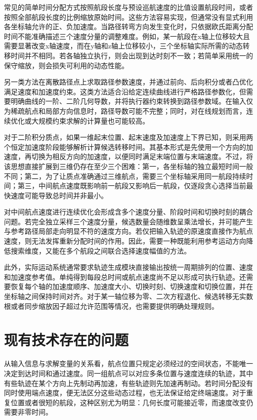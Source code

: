 \documentclass[UTF8,a4paper,12pt,fontset=fandol]{ctexart}
\begin{document}
常见的简单时间分配方式按照航段长度与预设巡航速度的比值设置航段时间，或者按照全部航段长度的比例缩放原始时间。这些方法容易实现，但通常没有显式利用各坐标轴允许的正、负加速度。当路径转弯方向发生变化时，只依据欧氏距离分配时间不能准确描述三个速度分量的调整难度。例如，某一航段在x轴上位移较大且需要显著改变x轴速度，而在y轴和z轴上位移较小，三个坐标轴实际所需的动态转移时间并不相同。若各轴独立执行，则会出现到达时刻不一致；若简单采用统一的保守缩放，则会损失可利用的动态性能。

另一类方法在离散路径点上求取路径参数速度，并通过前向、后向积分或者凸优化满足速度和加速度约束。这类方法适合沿给定连续曲线进行严格路径参数化，但需要明确曲线的一阶、二阶几何导数，并将执行器约束转换到路径参数域。在输入仅为稀疏航点和局部方向信息时，路径导数可能不完整；同时，对在线规划而言，连续优化或大规模约束求解的计算量也可能较高。

对于二阶积分质点，如果一维起末位置、起末速度及加速度上下界已知，则采用两个恒定加速度阶段能够解析计算候选转移时间。其基本形式是先使用一个方向的加速度，再切换为相反方向的加速度，以便同时满足末端位置与末端速度。不过，将该思想直接扩展到三维仍存在至少三个困难：第一，各坐标轴的独立最短时间一般不同；第二，为了让质点准确通过三维航点，需要三个坐标轴采用同一航段持续时间；第三，中间航点速度既影响前一航段又影响后一航段，仅逐段贪心选择当前最快速度可能导致总时间并非最小。

对中间航点速度进行连续优化会形成含多个速度分量、阶段时间和切换时刻的耦合问题。若完全独立采样三个速度分量，候选数量会随维数呈乘法增长，并可能产生与参考路径局部走向明显不符的速度方向。若仅把输入轨迹的原速度直接作为航点速度，则无法发挥重新分配时间的作用。因此，需要一种既能利用参考运动方向降低搜索维度，又能在多个航段之间联合选择速度幅值的方法。

此外，实际运动系统通常要求轨迹生成模块直接输出按统一周期排列的位置、速度和加速度参考值。单纯得到每段总时间或航点速度尚不足以形成可执行轨迹。还需要恢复每个轴的加速度顺序、加速度大小、切换时刻、切换速度和切换位置，并在坐标轴之间保持时间对齐。对于某一轴位移为零、二次方程退化、候选转移无实数根或者同步缩放因子超过允许范围等情况，也需要提供明确处理规则。

\section{现有技术存在的问题}

从输入信息与求解变量的关系看，航点位置只规定必须经过的空间状态，不能唯一决定到达时间和通过速度。同一组航点可以对应多条位置与速度连续的轨迹，其中有些轨迹在某个方向上先制动再加速，有些轨迹则先加速再制动。若时间分配没有同时使用端点速度，便无法区分这些动态过程，也无法保证给定终端速度。对于重复位置或者很短的航段，这种区别尤为明显：几何长度可能接近零，而速度改变仍需要非零时间。
\end{document}
